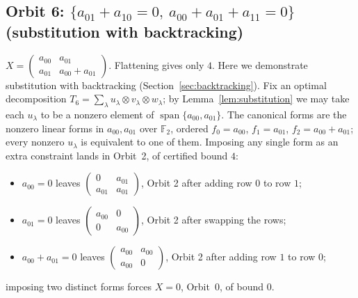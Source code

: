 \documentclass[11pt]{article}
\theoremstyle{definition}
\newcommand{\F}{\mathbb{F}}
\begin{document}
\subsection*{Orbit 6: $\{a_{01}+a_{10}=0,\ a_{00}+a_{01}+a_{11}=0\}$ (substitution with backtracking)}
$X=
\begin{pmatrix}a_{00} & a_{01} \\a_{01}&a_{00}+a_{01}
\end{pmatrix}$. Flattening gives
only $4$. Here we demonstrate substitution with backtracking
(Section~\ref{sec:backtracking}).
Fix an optimal decomposition $T_6=\sum_\lambda u_\lambda\otimes v_\lambda\otimes
w_\lambda$; by Lemma~\ref{lem:substitution} we may take each $u_\lambda$ to be a nonzero element of
$\operatorname{span}\{a_{00},a_{01}\}$. The canonical forms are the nonzero linear forms in
$a_{00},a_{01}$ over $\F_2$, ordered $f_0=a_{00}$, $f_1=a_{01}$,
$f_2=a_{00}+a_{01}$; every nonzero $u_\lambda$ is equivalent to one of them.
Imposing any single form as an extra constraint lands in Orbit~2, of certified
bound $4$:
\begin{itemize}
  \item $a_{00}=0$ leaves $
    \begin{pmatrix}0 & a_{01} \\a_{01}&a_{01}
    \end{pmatrix}$,
    Orbit 2 after adding row $0$ to row $1$;
  \item $a_{01}=0$ leaves $
    \begin{pmatrix}a_{00} & 0 \\0&a_{00}
    \end{pmatrix}$,
    Orbit 2 after swapping the rows;
  \item $a_{00}+a_{01}=0$ leaves $
    \begin{pmatrix}a_{00} & a_{00} \\a_{00}&0
    \end{pmatrix}$,
    Orbit 2 after adding row $1$ to row $0$;
\end{itemize}
imposing two distinct forms forces $X=0$, Orbit~0, of bound $0$.
\end{document}
